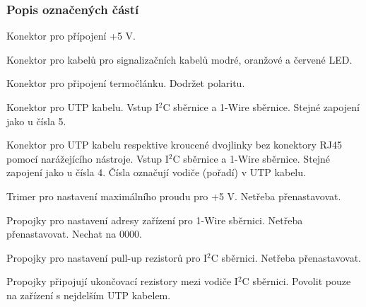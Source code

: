 \begin{Czech}
\subsubsection{Popis označených částí}
\end{Czech}

\begin{Czech}
Konektor pro přípojení +5 V.
\end{Czech}

\begin{Czech}
Konektor pro kabelů pro signalizačních kabelů modré, oranžové a červené LED.
\end{Czech}

\begin{Czech}
Konektor pro připojení termočlánku. Dodržet polaritu.
\end{Czech}

\begin{Czech}
Konektor pro UTP kabelu. Vstup I$^2$C sběrnice a 1-Wire sběrnice. Stejné zapojení jako u čísla 5.
\end{Czech}

\begin{Czech}
Konektor pro UTP kabelu respektive kroucené dvojlinky bez konektory RJ45 pomocí narážejícího nástroje. Vstup I$^2$C sběrnice a 1-Wire sběrnice. Stejné zapojení jako u čísla 4. Čísla označují vodiče (pořadí) v UTP kabelu.
\end{Czech}

\begin{Czech}
Trimer pro nastavení maximálního proudu pro +5 V. Netřeba přenastavovat.
\end{Czech}

\begin{Czech}
Propojky pro nastavení adresy zařízení pro 1-Wire sběrnici. Netřeba přenastavovat. Nechat na 0000.
\end{Czech}

\begin{Czech}
Propojky pro nastavení pull-up rezistorů pro I$^2$C sběrnici. Netřeba přenastavovat.
\end{Czech}

\begin{Czech}
Propojky připojují ukončovací rezistory mezi vodiče I$^2$C sběrnici. Povolit pouze na zařízení s nejdelším UTP kabelem.
\end{Czech}

